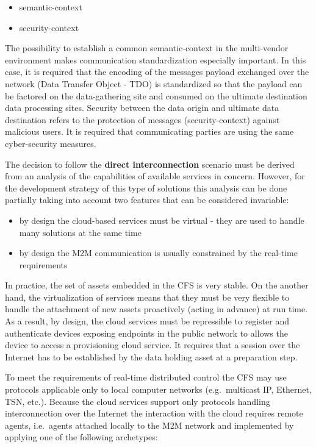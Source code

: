 \documentclass{jacsart}
\begin{document}
\begin{itemize}
      \item semantic-context
      \item security-context
\end{itemize}

The possibility to establish a common semantic-context in the multi-vendor environment makes communication standardization especially important. In this case, it is required that the encoding of the messages payload exchanged over the network (Data Transfer Object - TDO) is standardized so that the payload can be factored on the data-gathering
site and consumed on the ultimate destination data processing sites. Security between the data origin and ultimate data destination refers to the protection of messages (security-context) against malicious users. It is required that communicating parties are using the same cyber-security measures.

The decision to follow the \textbf{direct interconnection} scenario must be derived from an analysis of the capabilities of available services in concern. However, for the development strategy of this type of solutions this analysis can be done partially taking into account two features that can be considered invariable:

\begin{itemize}
      \item by design the cloud-based services must be virtual - they are used to handle many solutions at the same time
      \item by design the M2M communication is usually constrained by the real-time requirements
\end{itemize}

In practice, the set of assets embedded in the CFS is very stable. On the another hand, the virtualization of services means that they must be very flexible to handle the attachment of new assets proactively (acting in advance) at run time. As a result, by design, the cloud services must be repressible to register and authenticate devices exposing endpoints in the public network to allows the device to access a provisioning cloud service. It requires that a session over the Internet has to be established by the data holding asset at a preparation step.

To meet the requirements of real-time distributed control the CFS may use protocols applicable only to local computer networks (e.g.~multicast IP, Ethernet, TSN, etc.). Because the cloud services support only protocols handling interconnection over the Internet the interaction with the cloud requires remote agents, i.e.~agents attached locally to the M2M network and implemented by applying one of the following archetypes:
\end{document}
